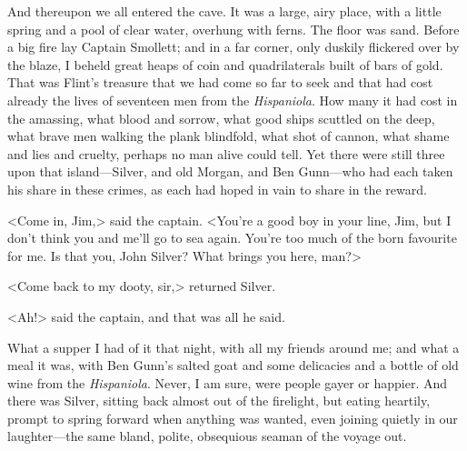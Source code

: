 And thereupon we all entered the cave. It was a large, airy place, with a little spring and a pool of clear water, overhung with ferns. The floor was sand. Before a big fire lay Captain Smollett; and in a far corner, only duskily flickered over by the blaze, I beheld great heaps of coin and quadrilaterals built of bars of gold. That was Flint's treasure that we had come so far to seek and that had cost already the lives of seventeen men from the \textit{Hispaniola}. How many it had cost in the amassing, what blood and sorrow, what good ships scuttled on the deep, what brave men walking the plank blindfold, what shot of cannon, what shame and lies and cruelty, perhaps no man alive could tell. Yet there were still three upon that island—Silver, and old Morgan, and Ben Gunn—who had each taken his share in these crimes, as each had hoped in vain to share in the reward.

<Come in, Jim,> said the captain. <You're a good boy in your line, Jim, but I don't think you and me'll go to sea again. You're too much of the born favourite for me. Is that you, John Silver? What brings you here, man?>

<Come back to my dooty, sir,> returned Silver.

<Ah!> said the captain, and that was all he said.

What a supper I had of it that night, with all my friends around me; and what a meal it was, with Ben Gunn's salted goat and some delicacies and a bottle of old wine from the \textit{Hispaniola}. Never, I am sure, were people gayer or happier. And there was Silver, sitting back almost out of the firelight, but eating heartily, prompt to spring forward when anything was wanted, even joining quietly in our laughter—the same bland, polite, obsequious seaman of the voyage out.